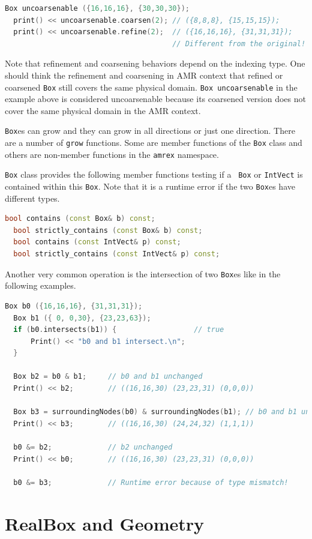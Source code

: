 {\begin{lstlisting}[language=cpp]
  Box uncoarsenable ({16,16,16}, {30,30,30});
  print() << uncoarsenable.coarsen(2); // ({8,8,8}, {15,15,15});
  print() << uncoarsenable.refine(2);  // ({16,16,16}, {31,31,31});
                                       // Different from the original!
\end{lstlisting}
Note that refinement and coarsening behaviors depend on the indexing
type.  One should think the refinement and coarsening in AMR context
that refined or coarsened {\tt Box} still covers the same physical
domain.  {\tt Box uncoarsenable} in the example above is considered
uncoarsenable because its coarsened version does not cover the same
physical domain in the AMR context.

{\tt Box}es can grow and they can grow in all directions or just one
direction.  There are a number of {\tt grow} functions.  Some are
member functions of the {\tt Box} class and others are non-member
functions in the {\tt amrex} namespace. 

{\tt Box} class provides the following member functions testing if a {\tt
  Box} or {\tt IntVect} is contained within this {\tt Box}.  Note that
it is a runtime error if the two {\tt Box}es have different types.
\begin{lstlisting}[language=cpp]
  bool contains (const Box& b) const;
  bool strictly_contains (const Box& b) const;
  bool contains (const IntVect& p) const;
  bool strictly_contains (const IntVect& p) const;
\end{lstlisting}

Another very common operation is the intersection of two {\tt Box}es
like in the following examples.
\begin{lstlisting}[language=cpp]
  Box b0 ({16,16,16}, {31,31,31});
  Box b1 ({ 0, 0,30}, {23,23,63});
  if (b0.intersects(b1)) {                  // true
      Print() << "b0 and b1 intersect.\n"; 
  }

  Box b2 = b0 & b1;     // b0 and b1 unchanged
  Print() << b2;        // ((16,16,30) (23,23,31) (0,0,0))

  Box b3 = surroundingNodes(b0) & surroundingNodes(b1); // b0 and b1 unchanged
  Print() << b3;        // ((16,16,30) (24,24,32) (1,1,1))

  b0 &= b2;             // b2 unchanged
  Print() << b0;        // ((16,16,30) (23,23,31) (0,0,0))

  b0 &= b3;             // Runtime error because of type mismatch!
\end{lstlisting}

\section{RealBox and Geometry}

}
